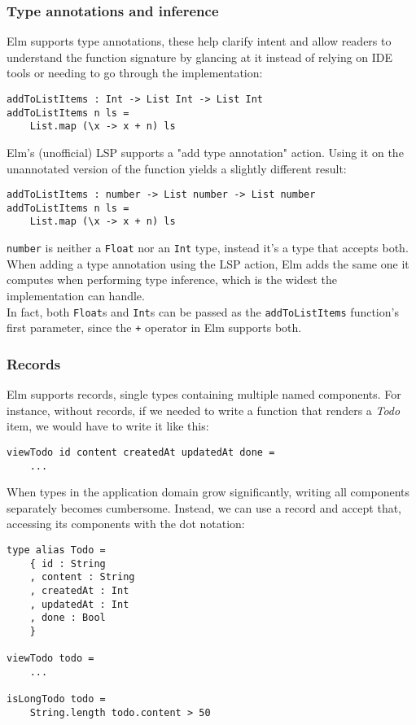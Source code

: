 \subsubsection{Type annotations and inference}
Elm supports type annotations, these help clarify intent and allow readers to understand the function signature by glancing at it instead of relying on IDE tools or needing to go through the implementation:
\begin{verbatim}
addToListItems : Int -> List Int -> List Int
addToListItems n ls =
    List.map (\x -> x + n) ls
\end{verbatim}

Elm's (unofficial) LSP supports a "add type annotation" action. Using it on the unannotated version of the function yields a slightly different result:
\begin{verbatim}
addToListItems : number -> List number -> List number
addToListItems n ls =
    List.map (\x -> x + n) ls
\end{verbatim}
\texttt{number} is neither a \texttt{Float} nor an \texttt{Int} type, instead it's a type that accepts both. When adding a type annotation using the LSP action, Elm adds the same one it computes when performing type inference, which is the widest the implementation can handle.\\
In fact, both \texttt{Float}s and \texttt{Int}s can be passed as the \texttt{addToListItems} function's first parameter, since the \texttt{+} operator in Elm supports both.

\subsubsection{Records}
Elm supports records, single types containing multiple named components. For instance, without records, if we needed to write a function that renders a \textit{Todo} item, we would have to write it like this:
\begin{verbatim}
viewTodo id content createdAt updatedAt done =
    ...
\end{verbatim}
When types in the application domain grow significantly, writing all components separately becomes cumbersome. Instead, we can use a record and accept that, accessing its components with the dot notation:
\begin{verbatim}
type alias Todo =
    { id : String
    , content : String
    , createdAt : Int
    , updatedAt : Int
    , done : Bool
    }

viewTodo todo =
    ...

isLongTodo todo =
    String.length todo.content > 50
\end{verbatim}

